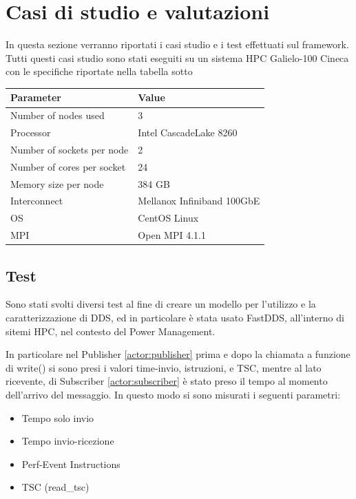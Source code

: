 \chapter{Casi di studio e valutazioni}
In questa sezione verranno riportati i casi studio e i test effettuati sul framework. Tutti questi casi studio sono stati eseguiti su un sistema HPC Galielo-100 Cineca con le specifiche riportate nella tabella sotto

\vspace{.7cm}
\begin{center}

\begin{tabular}{l|l}
    \hline
    \textbf{Parameter} & \textbf{Value} \\
    \hline
    Number of nodes used & 3 \\
    \hline
    Processor & Intel CascadeLake 8260 \\
    \hline
    Number of sockets per node & 2 \\
    \hline
    Number of cores per socket & 24 \\
    \hline
    Memory size per node & 384 GB \\
    \hline
    Interconnect & Mellanox Infiniband 100GbE \\
    \hline
    OS & CentOS Linux \\ 
    \hline
    MPI & Open MPI  4.1.1 \\
    \hline
\end{tabular}
\label{table:hpc}
\end{center}


\section{Test}
Sono stati svolti diversi test al fine di creare un modello per l'utilizzo e la caratterizzazione di DDS, ed in particolare è stata usato FastDDS, all'interno di sitemi HPC, nel contesto del Power Management. 

In particolare nel Publisher \ref{actor:publisher} prima e dopo la chiamata a funzione di write() %
si sono presi i valori time-invio, istruzioni, e TSC, mentre al lato ricevente, di Subscriber \ref{actor:subscriber} è stato preso il tempo al momento dell'arrivo del messaggio. In questo modo si sono misurati i seguenti parametri:
\begin{itemize}
    \item Tempo solo invio
    \item Tempo invio-ricezione
    \item Perf-Event Instructions
    \item TSC (read\_tsc)
\end{itemize}
